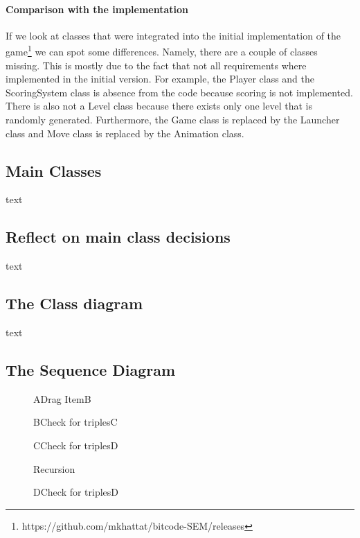 \documentclass{article}
\begin{document}


\paragraph{Comparison with the implementation} If we look at classes that were integrated into the initial implementation of the game\footnote{https://github.com/mkhattat/bitcode-SEM/releases} we can spot some differences. Namely, there are a couple of classes missing. This is mostly due to the fact that not all requirements where implemented in the initial version. For example, the Player class and the ScoringSystem class is absence from the code because scoring is not implemented. There is also not a Level class because there exists only one level that is randomly generated. Furthermore, the Game class is replaced by the Launcher class and Move class is replaced by the Animation class.


\subsection{Main Classes}
text

\subsection{Reflect on main class decisions}
text

\subsection{The Class diagram}
text

\subsection{The Sequence Diagram}
	\begin{figure}
		\centering
		\begin{sequencediagram}
			\begin{call}{A}{Drag Item}{B}{}
				\begin{call}{B}{Check for triples}{C}{}
					\begin{call}{C}{Check for triples}{D}{}
						\begin{sdblock}{Recursion}{}
							\begin{call}{D}{Check for triples}{D}{}
							\end{call}
						\end{sdblock}
					\end{call}
				\end{call}
			\end{call}
		\end{sequencediagram}
	\end{figure}
\end{document}
